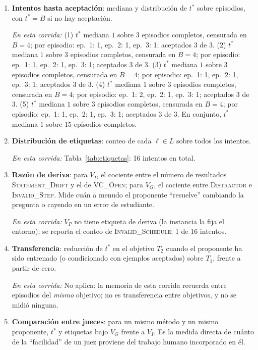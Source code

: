 \documentclass[11pt,a4paper]{article}
\begin{document}
\begin{enumerate}

  \item \textbf{Intentos hasta aceptación}: mediana y distribución de $t^*$ sobre episodios, con $t^* = B$ si no hay aceptación.

  \emph{En esta corrida:} (1) $t^*$ mediana $1$ sobre 3 episodios completos, censurada en $B = 4$; por episodio: ep.~1: 1, ep.~2: 1, ep.~3: 1; aceptados 3 de 3. (2) $t^*$ mediana $1$ sobre 3 episodios completos, censurada en $B = 4$; por episodio: ep.~1: 1, ep.~2: 1, ep.~3: 1; aceptados 3 de 3. (3) $t^*$ mediana $1$ sobre 3 episodios completos, censurada en $B = 4$; por episodio: ep.~1: 1, ep.~2: 1, ep.~3: 1; aceptados 3 de 3. (4) $t^*$ mediana $1$ sobre 3 episodios completos, censurada en $B = 4$; por episodio: ep.~1: 2, ep.~2: 1, ep.~3: 1; aceptados 3 de 3. (5) $t^*$ mediana $1$ sobre 3 episodios completos, censurada en $B = 4$; por episodio: ep.~1: 1, ep.~2: 1, ep.~3: 1; aceptados 3 de 3. En conjunto, $t^*$ mediana $1$ sobre 15 episodios completos.

  \item \textbf{Distribución de etiquetas}: conteo de cada $\ell \in L$ sobre todos los intentos.

  \emph{En esta corrida:} Tabla~\ref{tab:etiquetas}: 16 intentos en total.

  \item \textbf{Razón de deriva}: para $V_I$, el cociente entre el número de resultados \textsc{Statement\_Drift} y el de \textsc{VC\_Open}; para $V_G$, el cociente entre \textsc{Distractor} e \textsc{Invalid\_Step}. Mide cuán a menudo el proponente ``resuelve'' cambiando la pregunta o cayendo en un error de estudiante.

  \emph{En esta corrida:} $V_P$ no tiene etiqueta de deriva (la instancia la fija el entorno); se reporta el conteo de \textsc{Invalid\_Schedule}: 1 de 16 intentos.

  \item \textbf{Transferencia}: reducción de $t^*$ en el objetivo $T_2$ cuando el proponente ha sido entrenado (o condicionado con ejemplos aceptados) sobre $T_1$, frente a partir de cero.

  \emph{En esta corrida:} No aplica: la memoria de esta corrida recuerda entre episodios del \emph{mismo} objetivo; no es transferencia entre objetivos, y no se midió ninguna.

  \item \textbf{Comparación entre jueces}: para un mismo método y un mismo proponente, $t^*$ y etiquetas bajo $V_G$ frente a $V_I$. Es la medida directa de cuánto de la ``facilidad'' de un juez proviene del trabajo humano incorporado en él.


\end{enumerate}
\end{document}
